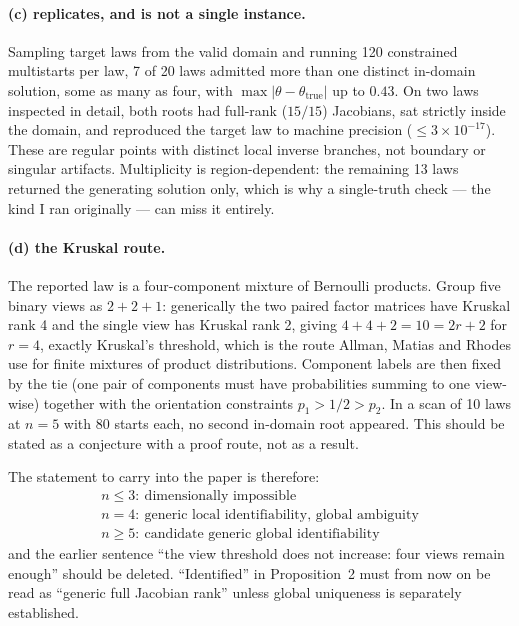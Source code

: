 \documentclass[11pt]{article}
\theoremstyle{remark}
\begin{document}
\paragraph{(c) replicates, and is not a single instance.} Sampling target laws from the valid domain and running 120 constrained multistarts per law, 7 of 20 laws admitted more than one distinct in-domain solution, some as many as four, with $\max|\theta-\theta_{\text{true}}|$ up to $0.43$. On two laws inspected in detail, both roots had full-rank ($15/15$) Jacobians, sat strictly inside the domain, and reproduced the target law to machine precision ($\le3\times10^{-17}$). These are regular points with distinct local inverse branches, not boundary or singular artifacts. Multiplicity is region-dependent: the remaining 13 laws returned the generating solution only, which is why a single-truth check --- the kind I ran originally --- can miss it entirely.

\paragraph{(d) the Kruskal route.} The reported law is a four-component mixture of Bernoulli products. Group five binary views as $2+2+1$: generically the two paired factor matrices have Kruskal rank 4 and the single view has Kruskal rank 2, giving $4+4+2=10=2r+2$ for $r=4$, exactly Kruskal's threshold, which is the route Allman, Matias and Rhodes use for finite mixtures of product distributions. Component labels are then fixed by the tie (one pair of components must have probabilities summing to one view-wise) together with the orientation constraints $p_1>1/2>p_2$. In a scan of 10 laws at $n=5$ with 80 starts each, no second in-domain root appeared. This should be stated as a conjecture with a proof route, not as a result.

\medskip
\noindent The statement to carry into the paper is therefore:
\[
\boxed{\begin{array}{l}
n\le3:\ \text{dimensionally impossible}\\
n=4:\ \text{generic local identifiability, global ambiguity}\\
n\ge5:\ \text{candidate generic global identifiability}
\end{array}}
\]
and the earlier sentence ``the view threshold does not increase: four views remain enough'' should be deleted. ``Identified'' in Proposition~2 must from now on be read as ``generic full Jacobian rank'' unless global uniqueness is separately established.
\end{document}
